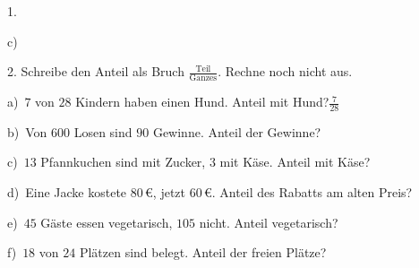 \documentclass[11pt]{article}
\newcommand{\grau}[1]{{\color{mbgrau}#1}}
\begin{document}
\begin{pfaufg}{}{1.}{}
\begin{minipage}[b]{0.32\linewidth}\centering
{}\par\smallskip
{\small c)\ }\par\smallskip
\linie{30mm}\par\medskip\linie{30mm}
\end{minipage}
\end{pfaufg}

\begin{pfaufg}{}{2.}{}
Schreibe den Anteil als Bruch $\frac{\text{Teil}}{\text{Ganzes}}$. Rechne noch nicht aus.\par\medskip
\grau{a)\ $7$ von $28$ Kindern haben einen Hund. Anteil mit Hund?\quad $\frac{7}{28}$}\par\medskip
\noindent\begin{minipage}[t]{0.48\linewidth}
b)\ Von $600$ Losen sind $90$ Gewinne. Anteil der Gewinne?
\end{minipage}\hfill
\begin{minipage}[t]{0.48\linewidth}
c)\ $13$ Pfannkuchen sind mit Zucker, $3$ mit Käse. Anteil mit Käse?
\end{minipage}
\noindent\begin{minipage}[t]{0.48\linewidth}
d)\ Eine Jacke kostete $80\,€$, jetzt $60\,€$. Anteil des Rabatts am alten Preis?
\end{minipage}\hfill
\begin{minipage}[t]{0.48\linewidth}
e)\ $45$ Gäste essen vegetarisch, $105$ nicht. Anteil vegetarisch?
\end{minipage}
\noindent\begin{minipage}[t]{0.48\linewidth}
f)\ $18$ von $24$ Plätzen sind belegt. Anteil der freien Plätze?
\end{minipage}
\end{pfaufg}
\end{document}
